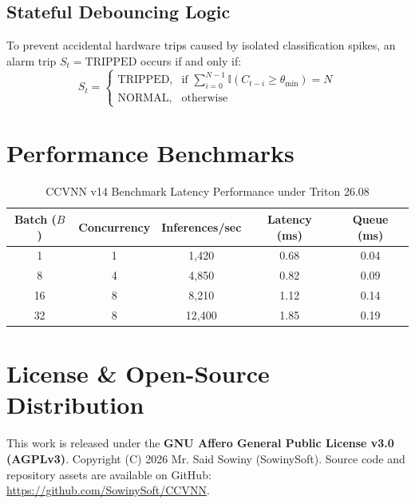 \documentclass[10pt,journal,compsoc]{IEEEtran}
\begin{document}
\subsection{Stateful Debouncing Logic}
To prevent accidental hardware trips caused by isolated classification spikes, an alarm trip $S_t = \text{TRIPPED}$ occurs if and only if:
\begin{equation}
S_t = \begin{cases} 
\text{TRIPPED}, & \text{if } \sum_{i=0}^{N-1} \mathbb{I}(C_{t-i} \ge \theta_{\text{min}}) = N \\ 
\text{NORMAL}, & \text{otherwise} 
\end{cases}
\end{equation}

\section{Performance Benchmarks}

\begin{table}[htbp]
\caption{CCVNN v14 Benchmark Latency Performance under Triton 26.08}
\label{tab:benchmarks}
\centering
\begin{tabular}{ccccc}
\toprule
\textbf{Batch ($B$)} & \textbf{Concurrency} & \textbf{Inferences/sec} & \textbf{Latency (ms)} & \textbf{Queue (ms)} \\
\midrule
1  & 1  & 1,420  & 0.68 & 0.04 \\
8  & 4  & 4,850  & 0.82 & 0.09 \\
16 & 8  & 8,210  & 1.12 & 0.14 \\
32 & 8  & 12,400 & 1.85 & 0.19 \\
\bottomrule
\end{tabular}
\end{table}

\section{License \& Open-Source Distribution}
This work is released under the \textbf{GNU Affero General Public License v3.0 (AGPLv3)}. Copyright (C) 2026 Mr. Said Sowiny (SowinySoft). Source code and repository assets are available on GitHub: \url{https://github.com/SowinySoft/CCVNN}.
\end{document}
